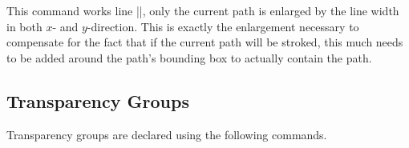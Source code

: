 \begin{command}{\pgfsetfadingforcurrentpathstroked{}}
    This command works line |\pgfsetfadingforcurrentpath|, only the current
    path is enlarged by the line width in both $x$- and $y$-direction. This is
    exactly the enlargement necessary to compensate for the fact that if the
    current path will be stroked, this much needs to be added around the path's
    bounding box to actually contain the path.
\begin{codeexample}[]
\end{codeexample}
\end{command}


\subsection{Transparency Groups}

Transparency groups are declared using the following commands.

